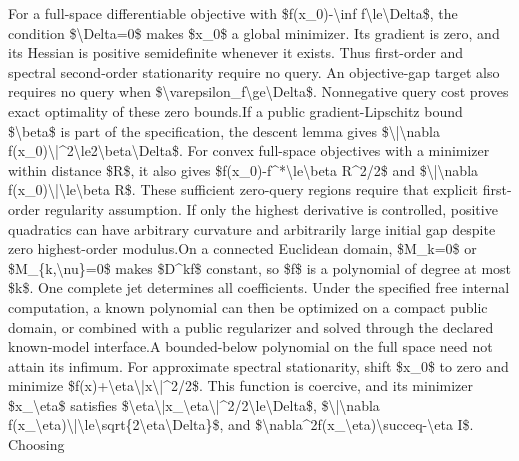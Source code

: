 \documentclass[10pt,a4paper]{article}
\begin{document}
\begingroup\raggedright\sloppy For a full-space differentiable objective with \$f(x\_\allowbreak{}0)-\textbackslash{}inf f\textbackslash{}le\textbackslash{}Delta\$,\allowbreak{} the condition \$\textbackslash{}Delta=\allowbreak{}0\$ makes \$x\_\allowbreak{}0\$ a global minimizer. Its gradient is zero,\allowbreak{} and its Hessian is positive semidefinite whenever it exists. Thus first-order and spectral second-order stationarity require no query. An objective-gap target also requires no query when \$\textbackslash{}varepsilon\_\allowbreak{}f\textbackslash{}ge\textbackslash{}Delta\$. Nonnegative query cost proves exact optimality of these zero bounds.\newline{}\newline{}If a public gradient-Lipschitz bound \$\textbackslash{}beta\$ is part of the specification,\allowbreak{} the descent lemma gives \$\textbackslash{}|\textbackslash{}nabla f(x\_\allowbreak{}0)\textbackslash{}|\textasciicircum{}2\textbackslash{}le2\textbackslash{}beta\textbackslash{}Delta\$. For convex full-space objectives with a minimizer within distance \$R\$,\allowbreak{} it also gives \$f(x\_\allowbreak{}0)-f\textasciicircum{}*\textbackslash{}le\textbackslash{}beta R\textasciicircum{}2/\allowbreak{}2\$ and \$\textbackslash{}|\textbackslash{}nabla f(x\_\allowbreak{}0)\textbackslash{}|\textbackslash{}le\textbackslash{}beta R\$. These sufficient zero-query regions require that explicit first-order regularity assumption. If only the highest derivative is controlled,\allowbreak{} positive quadratics can have arbitrary curvature and arbitrarily large initial gap despite zero highest-order modulus.\newline{}\newline{}On a connected Euclidean domain,\allowbreak{} \$M\_\allowbreak{}k=\allowbreak{}0\$ or \$M\_\allowbreak{}\{k,\allowbreak{}\textbackslash{}nu\}=\allowbreak{}0\$ makes \$D\textasciicircum{}kf\$ constant,\allowbreak{} so \$f\$ is a polynomial of degree at most \$k\$. One complete jet determines all coefficients. Under the specified free internal computation,\allowbreak{} a known polynomial can then be optimized on a compact public domain,\allowbreak{} or combined with a public regularizer and solved through the declared known-model interface.\newline{}\newline{}A bounded-below polynomial on the full space need not attain its infimum. For approximate spectral stationarity,\allowbreak{} shift \$x\_\allowbreak{}0\$ to zero and minimize \$f(x)+\textbackslash{}eta\textbackslash{}|x\textbackslash{}|\textasciicircum{}2/\allowbreak{}2\$. This function is coercive,\allowbreak{} and its minimizer \$x\_\allowbreak{}\textbackslash{}eta\$ satisfies \$\textbackslash{}eta\textbackslash{}|x\_\allowbreak{}\textbackslash{}eta\textbackslash{}|\textasciicircum{}2/\allowbreak{}2\textbackslash{}le\textbackslash{}Delta\$,\allowbreak{} \$\textbackslash{}|\textbackslash{}nabla f(x\_\allowbreak{}\textbackslash{}eta)\textbackslash{}|\textbackslash{}le\textbackslash{}sqrt\{2\textbackslash{}eta\textbackslash{}Delta\}\$,\allowbreak{} and \$\textbackslash{}nabla\textasciicircum{}2f(x\_\allowbreak{}\textbackslash{}eta)\textbackslash{}succeq-\textbackslash{}eta I\$. Choosing 
\end{document}
